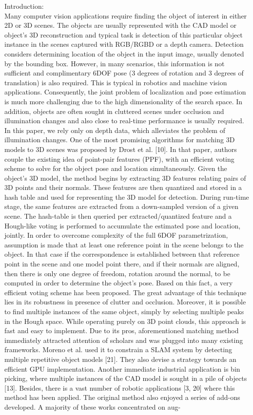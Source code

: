\documentclass[10]{article}
\begin{document}
Introduction:\\
Many computer vision applications require finding the object of interest in either 2D or 3D scenes. The objects are usually represented with the CAD model or object’s 3D reconstruction and typical task is detection of this particular object instance in the scenes captured with RGB/RGBD or a depth camera. Detection considers determining location of the object in the input image, usually denoted by the bounding box. However, in many scenarios, this information is not sufficient and complimentary 6DOF pose (3 degrees of rotation and 3 degrees of translation) is also required. This is typical in robotics and machine vision applications. Consequently, the joint problem of localization and pose estimation is much more challenging due to the high dimensionality of the search space. In addition, objects are often sought in cluttered scenes under occlusion and illumination changes and also close to real-time performance is usually required. 
In this paper, we rely only on depth data, which alleviates the problem of illumination changes. One of the most promising algorithms for matching 3D models to 3D scenes was proposed by Drost et al. [10]. In that paper, authors couple the existing idea of point-pair features (PPF), with an efficient voting scheme to solve for the object pose and location simultaneously. Given the object’s 3D model, the method begins by extracting 3D features relating pairs of 3D points and their normals. These features are then quantized and stored in a hash table and used for representing the 3D model
for detection. During run-time stage, the same features are extracted from a down-sampled version of a given scene. The hash-table is then queried per extracted/quantized feature and a Hough-like voting is performed to accumulate the estimated pose and location, jointly. In order to overcome complexity of the full 6DOF parametrization, assumption is made that at least one reference point in the scene belongs to the object. In that case if the correspondence is established between that reference point in the scene and one model point there, and if their normals are aligned, then there is only one degree of freedom, rotation around the normal, to be computed in order to determine the object’s pose. Based on this fact, a very efficient voting scheme has been proposed. The great advantage of this technique lies in its robustness in presence of clutter and occlusion. Moreover, it is possible to find multiple instances of the same object, simply by selecting multiple peaks in the Hough space. While operating purely on 3D point clouds, this approach is fast and easy to implement. Due to its pros, aforementioned matching method immediately attracted attention of scholars and was plugged into many existing frameworks. Moreno et al. used it to constrain a SLAM system by detecting multiple repetitive object models [21]. They also devise a strategy towards an efficient GPU implementation. Another immediate industrial application is bin picking, where multiple instances of the CAD model is sought in a pile of objects [13]. Besides, there is a vast number of robotic applications [3, 20] where this method has been applied. The original method also enjoyed a series of add-ons developed. A majority of these works concentrated on aug-
\end{document}
